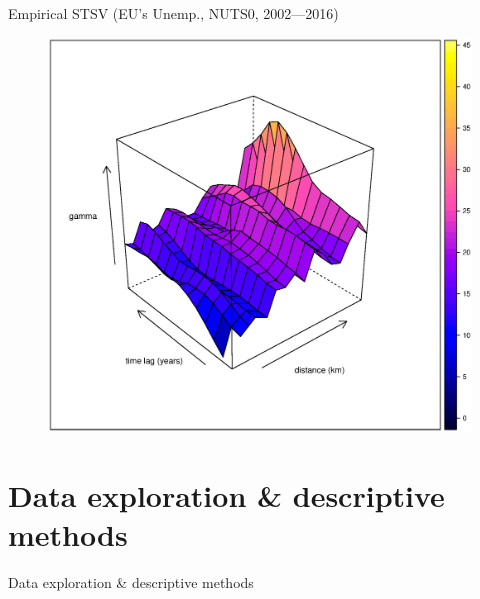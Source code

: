 \documentclass{beamer}
\begin{document}
\begin{frame}{Empirical STSV (EU's Unemp., NUTS0, 2002---2016)}
\begin{figure}
	\includegraphics[width=.7\textwidth]{IMG/sp_STV.eps}
\end{figure}
\end{frame}
\section{Data exploration \& descriptive methods}
\begin{frame}{Data exploration \& descriptive methods}
\end{frame}
\end{document}
